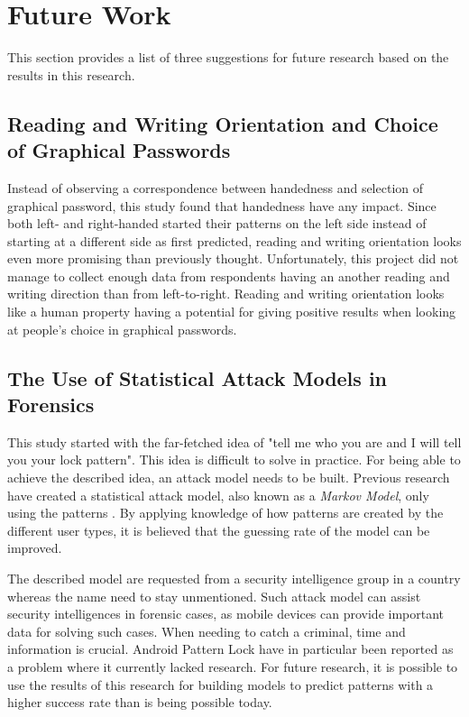   \clearpage
  \section{Future Work}\label{sec:futureWork}

    This section provides a list of three suggestions for future research based on the results in this research.

    \subsection{Reading and Writing Orientation and Choice of Graphical Passwords}
      Instead of observing a correspondence between handedness and selection of graphical password, this study found that handedness have any impact. Since both left- and right-handed started their patterns on the left side instead of starting at a different side as first predicted, reading and writing orientation looks even more promising than previously thought. Unfortunately, this project did not manage to collect enough data from respondents having an another reading and writing direction than from left-to-right. Reading and writing orientation looks like a human property having a potential for giving positive results when looking at people's choice in graphical passwords. 

    \subsection{The Use of Statistical Attack Models in Forensics}
      This study started with the far-fetched idea of "tell me who you are and I will tell you your lock pattern". This idea is difficult to solve in practice. For being able to achieve the described idea, an attack model needs to be built. Previous research have created a statistical attack model, also known as a {\it Markov Model}, only using the patterns \cite{Uellenbeck}. By applying knowledge of how patterns are created by the different user types, it is believed that the guessing rate of the model can be improved. 

      The described model are requested from a security intelligence group in a country whereas the name need to stay unmentioned. Such attack model can assist security intelligences in forensic cases, as mobile devices can provide important data for solving such cases. When needing to catch a criminal, time and information is crucial. Android Pattern Lock have in particular been reported as a problem where it currently lacked research. For future research, it is possible to use the results of this research for building models to predict patterns with a higher success rate than is being possible today. 

